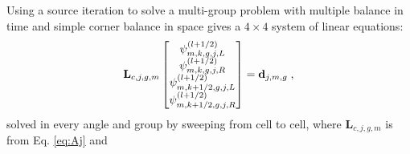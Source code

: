 Using a source iteration to solve a multi-group problem with multiple balance in time \cite{variansyah_robust_2021} and simple corner balance in space \cite{adams_subcell_1997} gives a $4\times 4$ system of linear equations:
\begin{equation}
    \label{eq:app:si_sys}
    \mathbf{L}_{c,j,g,m} \begin{bmatrix}
    \psi_{m,k,g,j,L}^{(l+1/2)} \\
    \psi_{m,k,g,j,R}^{(l+1/2)} \\
    \psi_{m,k+1/2,g,j,L}^{(l+1/2)} \\
    \psi_{m,k+1/2,g,j,R}^{(l+1/2)}
    \end{bmatrix}
    = \mathbf{d}_{j,m,g} \;,
\end{equation}
solved in every angle and group by sweeping from cell to cell,
where $\mathbf{L}_{c,j,g,m}$ is from Eq. \eqref{eq:Aj}
and

